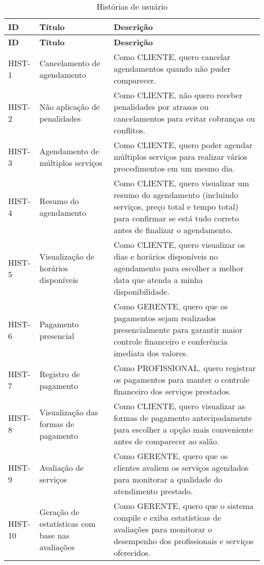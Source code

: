 \begin{longtable}{|p{2cm}|p{4cm}|p{9cm}|}
	\caption{Histórias de usuário} \label{tab:historias_de_usuario}\\
	\hline
	\textbf{ID} & \textbf{Título} & \textbf{Descrição} \\ \hline
	\endfirsthead
	
	\hline
	\textbf{ID} & \textbf{Título} & \textbf{Descrição} \\ \hline
	\endhead
	HIST-1 & Cancelamento de agendamento & Como CLIENTE, quero cancelar agendamentos quando não puder comparecer. \\ \hline
	HIST-2 & Não aplicação de penalidades & Como CLIENTE, não quero receber penalidades por atrasos ou cancelamentos para evitar cobranças ou conflitos. \\ \hline
	HIST-3 & Agendamento de múltiplos serviços & Como CLIENTE, quero poder agendar múltiplos serviços para realizar vários procedimentos em um mesmo dia. \\ \hline
	HIST-4 & Resumo do agendamento & Como CLIENTE, quero visualizar um resumo do agendamento (incluindo serviços, preço total e tempo total) para confirmar se está tudo correto antes de finalizar o agendamento. \\ \hline
	HIST-5 & Visualização de horários disponíveis & Como CLIENTE, quero visualizar os dias e horários disponíveis no agendamento para escolher a melhor data que atenda a minha disponibilidade. \\ \hline
	HIST-6 & Pagamento presencial & Como GERENTE, quero que os pagamentos sejam realizados presencialmente para garantir maior controle financeiro e conferência imediata dos valores. \\ \hline
	HIST-7 & Registro de pagamento & Como PROFISSIONAL, quero registrar os pagamentos para manter o controle financeiro dos serviços prestados. \\ \hline
	HIST-8 & Visualização das formas de pagamento & Como CLIENTE, quero visualizar as formas de pagamento antecipadamente para escolher a opção mais conveniente antes de comparecer ao salão. \\ \hline
	HIST-9 & Avaliação de serviços & Como GERENTE, quero que os clientes avaliem os serviços agendados para monitorar a qualidade do atendimento prestado. \\ \hline
	HIST-10 & Geração de estatísticas com base nas avaliações & Como GERENTE, quero que o sistema compile e exiba estatísticas de avaliações para monitorar o desempenho dos profissionais e serviços oferecidos. \\ \hline

\end{longtable}
